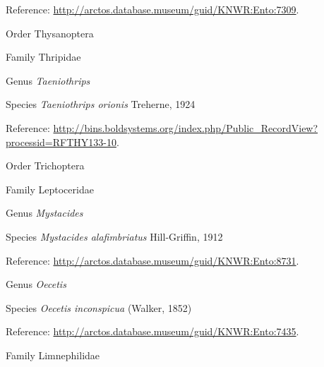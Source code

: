 \documentclass[9pt, article]{memoir}
\begin{document}
\begin{multicols}{2}
\vspace{6pt}Reference: 
\url{http://arctos.database.museum/guid/KNWR:Ento:7309}.

\vspace{6pt}\noindent\hspace{18pt}Order Thysanoptera


\vspace{6pt}\noindent\hspace{24pt}Family Thripidae


\vspace{6pt}\noindent\hspace{30pt}Genus \textit{Taeniothrips}


\vspace{6pt}\noindent\hspace{36pt}Species \textit{Taeniothrips orionis} Treherne, 1924


\vspace{6pt}Reference: 
\url{http://bins.boldsystems.org/index.php/Public_RecordView?processid=RFTHY133-10}.

\vspace{6pt}\noindent\hspace{18pt}Order Trichoptera


\vspace{6pt}\noindent\hspace{24pt}Family Leptoceridae


\vspace{6pt}\noindent\hspace{30pt}Genus \textit{Mystacides}


\vspace{6pt}\noindent\hspace{36pt}Species \textit{Mystacides alafimbriatus} Hill-Griffin, 1912


\vspace{6pt}Reference: 
\url{http://arctos.database.museum/guid/KNWR:Ento:8731}.

\vspace{6pt}\noindent\hspace{30pt}Genus \textit{Oecetis}


\vspace{6pt}\noindent\hspace{36pt}Species \textit{Oecetis inconspicua} (Walker, 1852)


\vspace{6pt}Reference: 
\url{http://arctos.database.museum/guid/KNWR:Ento:7435}.

\vspace{6pt}\noindent\hspace{24pt}Family Limnephilidae



\end{multicols}
\end{document}
